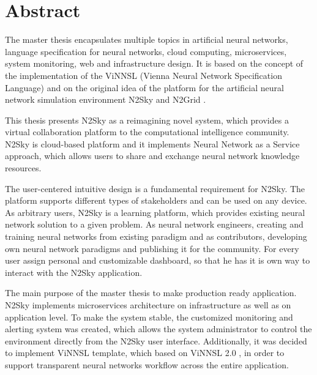 
%

\thispagestyle{empty}

\section*{Abstract}

The master thesis encapsulates multiple topics in artificial neural networks, language specification for neural networks, cloud computing, microservices, system monitoring, web and infrastructure design. It is based on the concept of the implementation of the ViNNSL (Vienna Neural Network Specification Language) \cite{Beran2008} and on the original idea of the platform for the artificial neural network simulation environment N2Sky \cite{ravo} and N2Grid \cite{schikuta2004n2grid}. 

This thesis presents N2Sky as a reimagining novel system, which provides a virtual collaboration platform to the computational intelligence community. N2Sky is cloud-based platform and it implements Neural Network as a Service approach, which allows users to share and exchange neural network knowledge resources.

The user-centered intuitive design is a fundamental requirement for N2Sky. The platform supports different types of stakeholders and can be used on any device. As arbitrary users, N2Sky is a learning platform, which provides existing neural network solution to a given problem. As neural network engineers, creating and training neural networks from existing paradigm and as contributors, developing own neural network paradigms and publishing it for the community. For every user assign personal and customizable dashboard, so that he has it is own way to interact with the N2Sky application. 

The main purpose of the master thesis to make production ready application. N2Sky implements microservices architecture on infrastructure as well as on application level. To make the system stable, the customized monitoring and alerting system was created, which allows the system administrator to control the environment directly from the N2Sky user interface. Additionally, it was decided to implement ViNNSL template, which based on ViNNSL 2.0 \cite{ijcnn15}, in order to support transparent neural networks workflow across the entire application.

